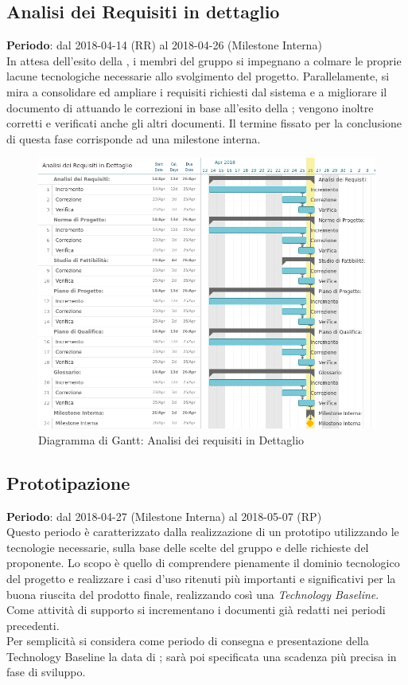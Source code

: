 \subsection{Analisi dei Requisiti in dettaglio}
\textbf{Periodo}: dal 2018-04-14 (RR) al 2018-04-26 (Milestone Interna)\\

In attesa dell'esito della \RR{}, i membri del gruppo si impegnano a colmare le proprie lacune tecnologiche necessarie allo svolgimento del progetto. Parallelamente, si mira a consolidare ed ampliare i requisiti richiesti dal sistema e a migliorare il documento di \AdR{} attuando le correzioni in base all’esito della \RR{}; vengono inoltre corretti e verificati anche gli altri documenti. Il termine fissato per la conclusione di questa fase corrisponde ad una milestone interna.

\begin{figure}[h!]
	\centerline{\includegraphics[scale=0.55]{img/DiagrammiGantt/AnalisiRequisitiDettaglio.jpg}}
	\caption{Diagramma di Gantt: Analisi dei requisiti in Dettaglio}
	\label{fig:gantt_ana_req_dett}
\end{figure}
\clearpage

\subsection{Prototipazione}
\textbf{Periodo}: dal 2018-04-27 (Milestone Interna) al 2018-05-07 (RP)\\

Questo periodo è caratterizzato dalla realizzazione di un prototipo utilizzando le tecnologie necessarie, sulla base delle scelte del gruppo \Gruppo{} e delle richieste del proponente.
Lo scopo è quello di comprendere pienamente il dominio tecnologico del progetto e realizzare i casi d'uso ritenuti più importanti e significativi per la buona riuscita del prodotto finale, realizzando così una \emph{Technology Baseline}. \\ 
Come attività di supporto si incrementano i documenti già redatti nei periodi precedenti.\\
Per semplicità si considera come periodo di consegna e presentazione della Technology Baseline la data di \RP{}; sarà poi specificata una scadenza più precisa in fase di sviluppo.

